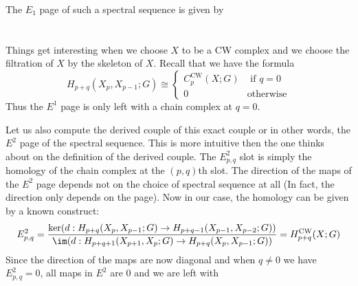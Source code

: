 \documentclass[a4paper]{article}
\begin{document}
The $E_1$ page of such a spectral sequence is given by \\~\\
\\

Things get interesting when we choose $X$ to be a CW complex and we choose the filtration of $X$ by the skeleton of $X$. Recall that we have the formula $$H_{p+q}(X_p,X_{p-1};G)\cong\begin{cases}
C_p^\text{CW}(X;G) & \text{ if } q=0\\
0 & \text{otherwise}
\end{cases}$$ Thus the $E^1$ page is only left with a chain complex at $q=0$. 

Let us also compute the derived couple of this exact couple or in other words, the $E^2$ page of the spectral sequence. This is more intuitive then the one thinks about on the definition of the derived couple. The $E_{p,q}^2$ slot is simply the homology of the chain complex at the $(p,q)$th slot. The direction of the maps of the $E^2$ page depends not on the choice of spectral sequence at all (In fact, the direction only depends on the page). Now in our case, the homology can be given by a known construct: $$E_{p,q}^2=\frac{\ker(d:H_{p+q}(X_p,X_{p-1};G)\to H_{p+q-1}(X_{p-1},X_{p-2};G))}{\im(d:H_{p+q+1}(X_{p+1},X_p;G)\to H_{p+q}(X_p,X_{p-1};G))}=H_{p+q}^\text{CW}(X;G)$$ Since the direction of the maps are now diagonal and when $q\neq 0$ we have $E_{p,q}^2=0$, all maps in $E^2$ are $0$ and we are left with \\~\\
\\
\end{document}
